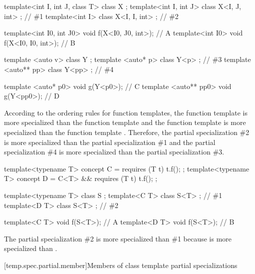 \pnum
\begin{example}
\begin{codeblock}
template<int I, int J, class T> class X { };
template<int I, int J>          class X<I, J, int> { };         // \#1
template<int I>                 class X<I, I, int> { };         // \#2

template<int I0, int J0> void f(X<I0, J0, int>);                // A
template<int I0>         void f(X<I0, I0, int>);                // B

template <auto v>    class Y { };
template <auto* p>   class Y<p> { };                            // \#3
template <auto** pp> class Y<pp> { };                           // \#4

template <auto* p0>   void g(Y<p0>);                            // C
template <auto** pp0> void g(Y<pp0>);                           // D
\end{codeblock}

According to the ordering rules for function templates,
the function template
is more specialized than the function template
and
the function template
is more specialized than the function template
.
Therefore, the partial specialization \#2
is more specialized than the partial specialization \#1
and the partial specialization \#4
is more specialized than the partial specialization \#3.
\end{example}
\begin{example}
\begin{codeblock}
template<typename T> concept C = requires (T t) { t.f(); };
template<typename T> concept D = C<T> && requires (T t) { t.f(); };

template<typename T> class S { };
template<C T> class S<T> { };   // \#1
template<D T> class S<T> { };   // \#2

template<C T> void f(S<T>);     // A
template<D T> void f(S<T>);     // B
\end{codeblock}
The partial specialization \#2 is more specialized than \#1
because  is more specialized than .
\end{example}

[temp.spec.partial.member]{Members of class template partial specializations}

